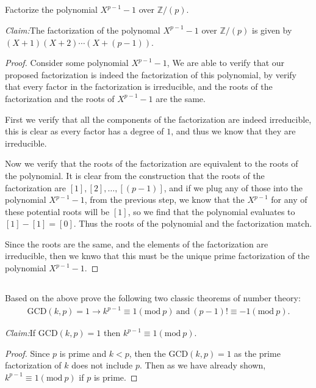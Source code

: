 \documentclass[10pt]{amsart}
\newcommand{\Z}{\mathbb{Z}}
\newcommand{\ra}{\rightarrow}
\renewcommand{\gcd}[2]{\text{GCD}\left(#1,#2\right)}
\renewcommand{\mod}[2]{#1\left(\text{mod}\ #2\right)}
\newenvironment{claim}[1]{\par\noindent\textit{Claim:}\space#1}{}
\begin{document}
\subsection{}%
\label{sub:3c}

Factorize the polynomial $X^{p-1}-1$ over $\Z/(p)$.

\begin{claim}
  The factorization of the polynomal $X^{p-1}-1$ over $\Z/(p)$ is given by
  $(X+1)(X+2)\cdots(X+(p-1))$.
\end{claim}
\begin{proof}
  Consider some polynomial $X^{p-1}-1$, We are able to verify that our proposed
  factorization is indeed the factorization of this polynomial, by verify that
  every factor in the factorization is irreducible, and the roots of the
  factorization and the roots of $X^{p-1}-1$ are the same.

  First we verify that all the components of the factorization are indeed
  irreducible, this is clear as every factor has a degree of $1$, and thus we
  know that they are irreducible.

  Now we verify that the roots of the factorization are equivalent to the roots
  of the polynomial. It is clear from the construction that the roots of the
  factorization are $[1],[2],\ldots,[(p-1)]$, and if we plug any of those into
  the polynomial $X^{p-1}-1$, from the previous step, we know that the
  $X^{p-1}$ for any of these potential roots will be $[1]$, so we find that the
  polynomial evaluates to $[1]-[1]=[0]$. Thus the roots of the polynomial and
  the factorization match.

  Since the roots are the same, and the elements of the factorization are
  irreducible, then we knwo that this must be the unique prime factorization of
  the polynomial $X^{p-1}-1$.
\end{proof}

\subsection{}%
\label{sub:3d}

Based on the above prove the following two classic theorems of number theory:
\begin{align*}
  \gcd{k}{p}=1\ra k^{p-1}\equiv \mod{1}{p}\ \text{and}\ (p-1)!\equiv
  \mod{-1}{p}.
\end{align*}

\begin{claim}
  If $\gcd{k}{p}=1$ then $k^{p-1}\equiv\mod{1}{p}$.
\end{claim}
\begin{proof}
  Since $p$ is prime and $k<p$, then the $\gcd{k}{p}=1$ as the prime
  factorization of $k$ does not include $p$. Then as we have already shown,
  $k^{p-1}\equiv\mod{1}{p}$ if $p$ is prime.
\end{proof}
\end{document}

